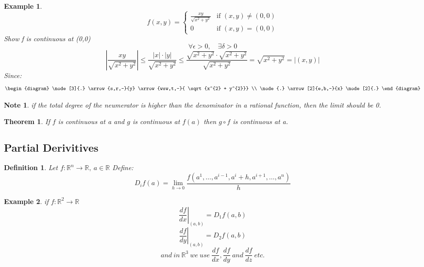 \documentclass[11pt]{article}
\def\RR{\mathbb{R}}
\newtheorem{theorem}{Theorem}[section]
\newtheorem{definition}{Definition}[section]
\newtheorem{example}{Example}[section]
\newtheorem*{note}{Note}
\begin{document}
\begin{example}

\[
 f(x,y) =
  \begin{cases}
   \frac{xy}{\sqrt{x^{2} + y^{2}}} & \text{if } (x,y) \neq (0,0) \\
   0       & \text{if } (x,y) = (0,0)
  \end{cases}
\]
Show f is continuous at (0,0)
\[\forall \epsilon > 0, \quad \exists \delta>0\]
\[\left| \frac{xy}{\sqrt{x^{2} + y^{2}}}\right| \leq \frac{|x| \cdot |y|}{\sqrt{x^{2} + y^{2}}} \leq \frac{\sqrt{x^{2} + y^{2}} \cdot \sqrt{x^{2} + y^{2}}}{\sqrt{x^{2} + y^{2}}}= \sqrt{x^{2} + y^{2}} = |(x,y)|\]
Since: \[\begin{diagram}
\node[3]{.} \arrow{s,r,-}{y} \arrow{wsw,t,-}{ \sqrt{x^{2} + y^{2}}} \\
\node{.} \arrow[2]{e,b,-}{x} \node[2]{.}
\end{diagram}\]
\end{example}
\begin{note}
if the total degree of the neumerator is higher than the denominator in a rational function, then the limit should be 0.
\end{note}

\begin{theorem}\label{T:composition}
If $f$ is continuous at a and $g$ is continuous at $f(a)$ then $g \circ f$ is continuous at a.
\end{theorem}

\subsection{Partial Derivitives}

\begin{definition}
Let $f:\RR^{n} \rightarrow \RR, \: a\in \RR$
Define: \[ D_{i}f(a) = \lim_{h \to 0}\frac{f(a^{1}, \dots , a^{i-1}, a^{i}+h, a^{i+1}, \dots , a^{n})}{h}\]
\end{definition}

\begin{example}
if $f:\RR^{2} \rightarrow \RR$
\[\left.\frac{df}{dx}\right| _{(a,b)} = D_{1}f(a,b)\]
\[\left.\frac{df}{dy}\right| _{(a,b)} = D_{2}f(a,b)\]
\[and \: in \: \RR^{3} \: we\: use \: \frac{df}{dx}, \frac{df}{dy} \: and \: \frac{df}{dz} \: etc.\]
\end{example}
\end{document}
